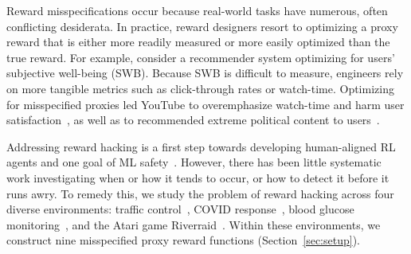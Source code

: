 Reward misspecifications occur because real-world tasks have numerous, often conflicting desiderata. In practice, reward designers resort to optimizing a proxy reward that is either more readily measured or more easily optimized than the true reward. For example, %
consider a recommender system optimizing for users' subjective well-being (SWB). Because SWB is difficult to measure, engineers rely on more tangible metrics such as click-through rates or watch-time. Optimizing for misspecified proxies led YouTube to overemphasize watch-time and harm user satisfaction~\citep{stray2020recommendersystem}, as well as to recommended extreme political content to users~\citep{times2019brazil}. %

Addressing reward hacking is a first step towards developing human-aligned RL agents and one goal of ML safety~\citep{Hendrycks2021UnsolvedPI}. However, there has been little systematic work investigating when or how it tends to occur, or how to detect it before it runs awry. To remedy this, we study the problem of reward hacking across four diverse environments: traffic control~\citep{wu2017flow}, COVID response~\citep{kompella2020pandemic}, blood glucose monitoring~\citep{fox2020bgp}, and the Atari game Riverraid~\citep{brockman2016gym}. Within these environments, we construct nine misspecified proxy reward functions (Section~\ref{sec:setup}).  %

